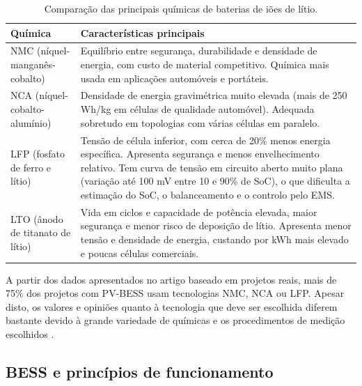 \begin{table}[H]
\centering
\renewcommand{\arraystretch}{1.5}
\begin{tabularx}{\textwidth}{
|>{\centering\arraybackslash}p{4cm}
|>{\centering\arraybackslash}X|}
\hline
\textbf{Química} & \textbf{Características principais} \\
\hline

NMC (níquel-manganês-cobalto) &
Equilíbrio entre segurança, durabilidade e densidade de energia, com custo de material competitivo. Química mais usada em aplicações automóveis e portáteis. \\
\hline

NCA (níquel-cobalto-alumínio) &
Densidade de energia gravimétrica muito elevada (mais de 250 Wh/kg em células de qualidade automóvel). Adequada sobretudo em topologias com várias células em paralelo. \\
\hline

LFP (fosfato de ferro e lítio) &
Tensão de célula inferior, com cerca de 20\% menos energia específica. Apresenta segurança e menos envelhecimento relativo. Tem curva de tensão em circuito aberto muito plana (variação até 100 mV entre 10 e 90\% de SoC), o que dificulta a estimação do SoC, o balanceamento e o controlo pelo EMS. \\
\hline

LTO (ânodo de titanato de lítio) &
Vida em ciclos e capacidade de potência elevada, maior segurança e menor risco de deposição de lítio. Apresenta menor tensão e densidade de energia, custando por kWh mais elevado e poucas células comerciais. \\
\hline

\end{tabularx}
\caption{Comparação das principais químicas de baterias de iões de lítio.}
\label{tab:quimicas_baterias}
\end{table}

A partir dos dados apresentados no artigo \cite{ Hesse2017} baseado em projetos reais, mais de 75\% dos projetos com PV-BESS usam tecnologias NMC, NCA ou LFP. Apesar disto, os valores e opiniões quanto à tecnologia que deve ser escolhida diferem bastante devido à grande variedade de químicas e os procedimentos de medição escolhidos \cite{ Hesse2017}.  


\subsection{BESS e princípios de funcionamento}
\label{sec:Ch2.1.3}

